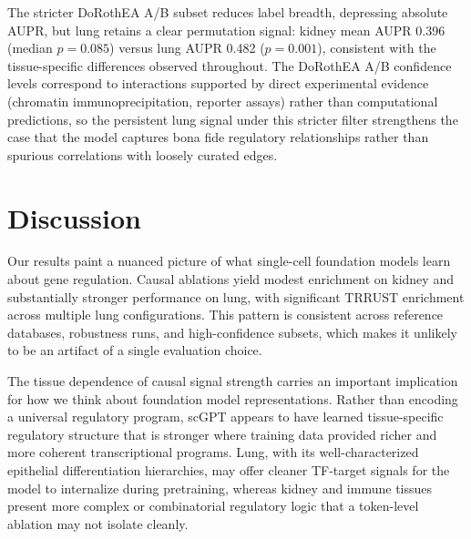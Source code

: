 \documentclass[10pt,letterpaper]{article}
\begin{document}
The stricter DoRothEA A/B subset reduces label breadth, depressing absolute
AUPR, but lung retains a clear permutation signal: kidney mean AUPR 0.396
(median $p{=}0.085$) versus lung AUPR 0.482 ($p{=}0.001$), consistent with the
tissue-specific differences observed throughout. The DoRothEA A/B confidence
levels correspond to interactions supported by direct experimental evidence
(chromatin immunoprecipitation, reporter assays) rather than computational
predictions, so the persistent lung signal under this stricter filter
strengthens the case that the model captures bona fide regulatory
relationships rather than spurious correlations with loosely curated edges.


\section*{Discussion}

Our results paint a nuanced picture of what single-cell foundation models
learn about gene regulation. Causal ablations yield modest enrichment on kidney
and substantially stronger performance on lung, with significant TRRUST
enrichment across multiple lung configurations. This pattern is consistent
across reference databases, robustness runs, and high-confidence subsets,
which makes it unlikely to be an artifact of a single evaluation choice.

The tissue dependence of causal signal strength carries an important
implication for how we think about foundation model representations. Rather
than encoding a universal regulatory program, scGPT appears to have learned
tissue-specific regulatory structure that is stronger where training data
provided richer and more coherent transcriptional programs. Lung, with its
well-characterized epithelial differentiation hierarchies, may offer cleaner
TF-target signals for the model to internalize during pretraining, whereas
kidney and immune tissues present more complex or combinatorial regulatory
logic that a token-level ablation may not isolate cleanly.
\end{document}
